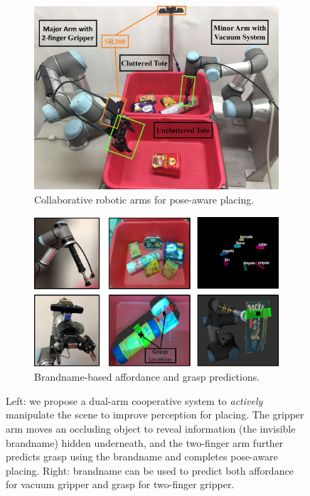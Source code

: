 \begin{figure}[htb]
   \centering
     \begin{subfigure}[t] {0.43\textwidth}
          \includegraphics[width=\textwidth]{./figures/robot_system_v2.jpg}
          \caption{Collaborative robotic arms for pose-aware placing. }
 	\label{fig:robot_system}
      \end{subfigure}
     \begin{subfigure}[t] {0.53\textwidth}
          \includegraphics[width=\textwidth]{./figures/affordance_v3.png}
          \caption{Brandname-based affordance and grasp predictions. }
	\label{fig:brandname-direction}
      \end{subfigure}
   \caption{Left: we propose a dual-arm cooperative system to \emph{actively} manipulate the scene to improve perception for placing. The gripper arm moves an occluding object to reveal information (the invisible brandname) hidden underneath, and the two-finger arm further predicts grasp using the brandname and completes pose-aware placing. Right: brandname can be used to predict both affordance for vacuum gripper and grasp for two-finger gripper.
}
\label{fig:baseline-active}
\end{figure}




